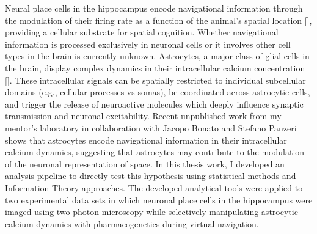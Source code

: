 Neural place cells in the hippocampus encode navigational information through the modulation of their firing rate as a function of the animal’s spatial location [\cite{okeefe1976}], providing a cellular substrate for spatial cognition. 
Whether navigational information is processed exclusively in neuronal cells or it involves other cell types in the brain is currently unknown. 
Astrocytes, a major class of glial cells in the brain, display complex dynamics in their intracellular calcium concentration [\cite{bazargani2016}]. 
These intracellular signals can be spatially restricted to individual subcellular domains (e.g., cellular processes vs somas), be coordinated across astrocytic cells, and trigger the release of neuroactive molecules which deeply influence synaptic transmission and neuronal excitability.
Recent unpublished work from my mentor’s laboratory in collaboration with Jacopo Bonato and Stefano Panzeri shows that astrocytes encode navigational information in their intracellular calcium dynamics, suggesting that astrocytes may contribute to the modulation of the neuronal representation of space. 
In this thesis work, I developed an analysis pipeline to directly test this hypothesis using statistical methods and Information Theory approaches. 
The developed analytical tools were applied to two experimental data sets in which neuronal place cells in the hippocampus were imaged using two-photon microscopy while selectively manipulating astrocytic calcium dynamics with pharmacogenetics during virtual navigation. 




